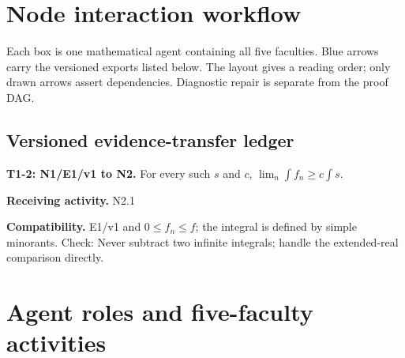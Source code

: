 \documentclass[preprint,12pt,aps,pra,showkeys,amsmath,amssymb,superscriptaddress,floatfix]{revtex4-2}
\theoremstyle{definition}
\theoremstyle{remark}
\newcommand{\field}[2]{\par\smallskip\noindent\textbf{#1.} #2\par}
\begin{document}
\clearpage\section{Node interaction workflow}

\begin{center}\end{center}

Each box is one mathematical agent containing all five faculties. Blue
arrows carry the versioned exports listed below. The layout gives a
reading order; only drawn arrows assert dependencies. Diagnostic repair
is separate from the proof DAG.

\subsection{Versioned evidence-transfer ledger}

\begingroup\small\linespread{1.05}\selectfont

\field{T1-2: N1/E1/v1 to N2}{For every such \(s\) and \(c\), \(\lim_n\int f_n\ge c\int s\).}

\field{Receiving activity}{N2.1}

\field{Compatibility}{E1/v1 and \(0\le f_n\le f\); the integral is defined by simple
minorants. Check: Never subtract two infinite integrals; handle the
extended-real comparison directly.}

\endgroup

\clearpage\section{Agent roles and five-faculty activities}\begingroup\small\linespread{1.05}\selectfont{}
\end{document}
